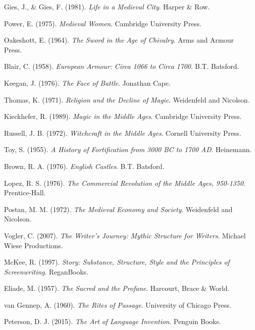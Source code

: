 Gies, J., \& Gies, F. (1981).
\textit{Life in a Medieval City}.
Harper \& Row.

Power, E. (1975).
\textit{Medieval Women}.
Cambridge University Press.

Oakeshott, E. (1964).
\textit{The Sword in the Age of Chivalry}.
Arms and Armour Press.

Blair, C. (1958).
\textit{European Armour: Circa 1066 to Circa 1700}.
B.T. Batsford.

Keegan, J. (1976).
\textit{The Face of Battle}.
Jonathan Cape.

Thomas, K. (1971).
\textit{Religion and the Decline of Magic}.
Weidenfeld and Nicolson.

Kieckhefer, R. (1989).
\textit{Magic in the Middle Ages}.
Cambridge University Press.

Russell, J. B. (1972).
\textit{Witchcraft in the Middle Ages}.
Cornell University Press.

Toy, S. (1955).
\textit{A History of Fortification from 3000 BC to 1700 AD}.
Heinemann.

Brown, R. A. (1976).
\textit{English Castles}.
B.T. Batsford.

Lopez, R. S. (1976).
\textit{The Commercial Revolution of the Middle Ages, 950-1350}.
Prentice-Hall.

Postan, M. M. (1972).
\textit{The Medieval Economy and Society}.
Weidenfeld and Nicolson.

Vogler, C. (2007).
\textit{The Writer's Journey: Mythic Structure for Writers}.
Michael Wiese Productions.

McKee, R. (1997).
\textit{Story: Substance, Structure, Style and the Principles of Screenwriting}.
ReganBooks.

Eliade, M. (1957).
\textit{The Sacred and the Profane}.
Harcourt, Brace \& World.

van Gennep, A. (1960).
\textit{The Rites of Passage}.
University of Chicago Press.

Peterson, D. J. (2015).
\textit{The Art of Language Invention}.
Penguin Books.

